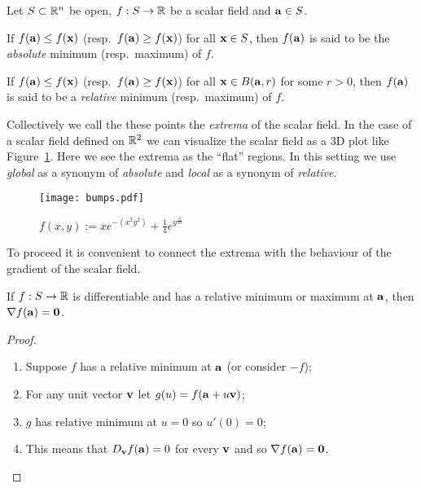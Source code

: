 Let \(S\subset \bR^n\) be open,
\(f:S \to \bR\) be a scalar field
and \(\aa \in S\).

\begin{definition}
    If \(f(\aa)\leq f(\xx)\) (resp.\ \(f(\aa)\geq f(\xx)\)) for all \(\xx \in S\), then \(f(\aa)\) is said to be the \emph{absolute} minimum (resp.\ maximum) of \(f\).
\end{definition}

\begin{definition}
    If \(f(\aa)\leq f(\xx)\) (resp.\ \(f(\aa)\geq f(\xx)\)) for all \(\xx \in B(\aa,r)\) for some \(r>0\), then \(f(\aa)\) is said to be a \emph{relative} minimum (resp.\ maximum) of \(f\).
\end{definition}

Collectively we call the these points the \emph{extrema} of the scalar field.
In the case of a scalar field defined on \(\bR^2\) we can visualize the scalar field as a 3D plot like Figure~\ref{fig:bumps}.
Here we see the extrema as the ``flat'' regions.
In this setting we use \emph{global} as a synonym of \emph{absolute} and \emph{local} as a synonym of \emph{relative}.


\begin{figure}[htb]
    \begin{center}
        \texttt{[image: bumps.pdf]}
        \caption{$f(x,y) := x e^{-(x^2y^2)}  + \frac{1}{4}e^{y^\frac{3}{10}}$}
        \label{fig:bumps}
    \end{center}
\end{figure}

To proceed it is convenient to connect the extrema with the behaviour of the gradient of the scalar field.

\begin{theorem}
    If \(f:S\to\bR\) is differentiable and has a relative minimum or maximum at \(\aa\), then \(\nabla f(\aa)=  \mathbf{0}\).
\end{theorem}

\begin{proof}
    \begin{enumerate}
        \item Suppose \(f\) has a relative minimum at \(\aa\) (or consider \(-f\));
        \item For any unit vector \(\vv\) let \(g(u) = f(\aa+u\vv)\);
        \item \(g\) has relative minimum at \(u=0\) so \(u'(0)=0\);
        \item This means that \(D_{\vv} f(\aa) = 0\) for every \(\vv\) and so \(\nabla f (\aa)= \mathbf{0}\). \qedhere
    \end{enumerate}
\end{proof}

